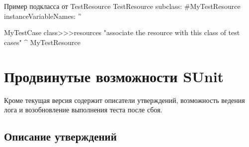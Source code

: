 \documentclass[a4paper,10pt,twoside]{book}
\begin{document}
\begin{classdef}[mytestresource]{Пример подкласса от TestResource}
 TestResource subclass: #MyTestResource
	instanceVariableNames: ''

MyTestCase class>>>resources
	"associate the resource with this class of test cases"
	^{ MyTestResource }
\end{classdef}






\section{Продвинутые возможности SUnit}

Кроме  текущая версия \sunit содержит описатели утверждений,
возможность ведения лога и возобновление выполнения теста после сбоя.

\subsection{Описание утверждений}
\end{document}
